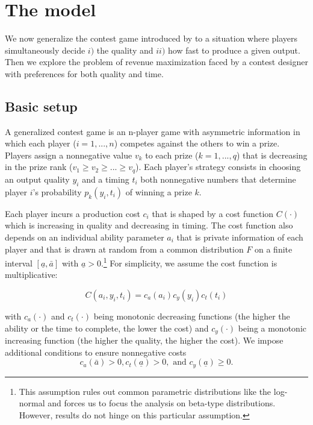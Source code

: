 \documentclass[12pt,]{article}
\theoremstyle{plain} %
\newcommand\lotype{\underline{a}}
\newcommand\hitype{\bar{a}}
\begin{document}
\section{The model}\label{the-model}

We now generalize the contest game introduced by
\citet{moldovanu2001optimal} to a situation where players simultaneously
decide \(i)\) the quality and \(ii)\) how fast to produce a given
output. Then we explore the problem of revenue maximization faced by a
contest designer with preferences for both quality and time.

\subsection{Basic setup}\label{basic-setup}

A generalized contest game is an n-player game with asymmetric
information in which each player (\(i=1,..., n\)) competes against the
others to win a prize. Players assign a nonnegative value \(v_k\) to
each prize (\(k=1, ..., q\)) that is decreasing in the prize rank
(\(v_1\geq v_2\geq ...\geq v_q\)). Each player's strategy consists in
choosing an output quality \(y_i\) and a timing \(t_i\) both nonnegative
numbers that determine player \(i\)'s probability \(p_{k}(y_i, t_i)\) of
winning a prize \(k\).

Each player incurs a production cost \(c_i\) that is shaped by a cost
function \(C(\cdot)\) which is increasing in quality and decreasing in
timing. The cost function also depends on an individual ability
parameter \(a_i\) that is private information of each player and that is
drawn at random from a common distribution \(F\) on a finite interval
\([\lotype, \hitype]\) with \(\lotype>0\).\footnote{This assumption
  rules out common parametric distributions like the log-normal and
  forces us to focus the analysis on beta-type distributions. However,
  results do not hinge on this particular assumption.} For simplicity,
we assume the cost function is multiplicative:

\begin{equation}
  C(a_i, y_i, t_i) = c_a(a_i) c_y(y_i) c_t(t_i)
\end{equation}

with \(c_a(\cdot)\) and \(c_t(\cdot)\) being monotonic decreasing
functions (the higher the ability or the time to complete, the lower the
cost) and \(c_{y}(\cdot)\) being a monotonic increasing function (the
higher the quality, the higher the cost). We impose additional
conditions to ensure nonnegative costs \[
    c_{a}(\hitype)>0, c_{t}(\lotype)>0, \text{ and } c_{y}(\lotype)\geq 0.
\]
\end{document}
